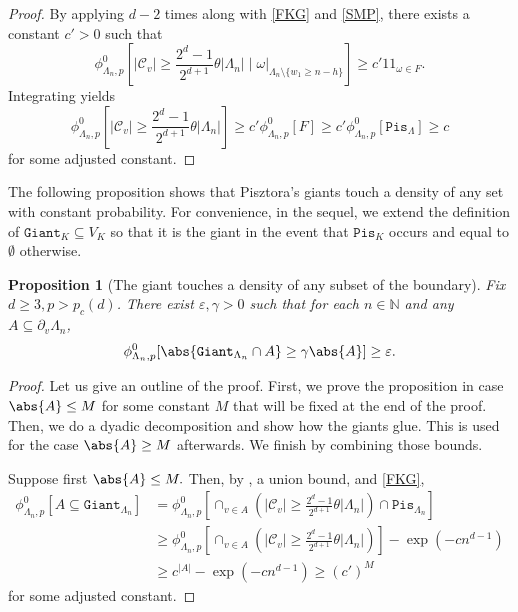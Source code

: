 \documentclass[article,11pt,reqno]{amsart}
\newcommand{\N}{\mathbb{N}}
\newcommand{\id}{1\! \!1}
\newcommand{\Giant}{\mathtt{Giant}}
\newcommand{\Pis}{\mathtt{Pis}}
\newtheorem{proposition}[theorem]{Proposition}
\begin{document}
\begin{appendix}
\begin{proof}
By applying  $d-2$ times along with \eqref{FKG} and \eqref{SMP}, there exists a constant $c'>0$ such that
$$
\phi^0_{\Lambda_n,p} \left[|\mathcal{C}_v |\geq\frac{2^d-1}{2^{d+1}}\theta|\Lambda_n| \mid \omega|_{\Lambda_n\setminus \{w_1\geq n-h\}}\right]\geq c'\id_{\omega\in F}.
$$
Integrating yields
$$
\phi^0_{\Lambda_n,p}\left[|\mathcal{C}_v|\geq \frac{2^d-1}{2^{d+1}}\theta|\Lambda_n|\right]\geq c'\phi^0_{\Lambda_n,p}[F]\geq c' \phi^0_{\Lambda_n,p}[\mathtt{Pis}_{\Lambda}]\geq c
$$
for some adjusted constant.
\end{proof}


The following proposition shows that Pisztora's giants touch a density of any set with constant probability. 
For convenience, in the sequel, we extend the definition of $\Giant_K \subseteq V_K$ so that it is the giant in the event that $\mathtt{Pis}_K$ occurs and equal to $\emptyset$ otherwise. 
\begin{proposition}[The giant touches a density of any subset of the boundary]\label{prop:giant_touches_face_density}
Fix $d \geq 3, p > p_c(d)$. There exist $\varepsilon, \gamma >0$ such that for each $n \in \N$ and any  $A \subseteq \partial_v \Lambda_n$, 
$$
\phi_{\Lambda_n,p}^0[\abs{ \mathtt{Giant}_{\Lambda_n} \cap A} \geq \gamma \abs{A}] \geq \varepsilon.
$$    
\end{proposition}
\begin{proof}
Let us give an outline of the proof. 
First, we prove the proposition in case $\abs{A}\leq M$ for some constant $M$ that will be fixed at the end of the proof. Then, we do a dyadic decomposition and show how the giants glue. This is used for the case $\abs{A}\geq M$ afterwards. We finish by combining those bounds. 

Suppose first $\abs{A}\leq M.$ Then, by , a union bound, and \eqref{FKG}, 
\begin{align*}
\phi^0_{\Lambda_n,p}[A\subseteq \mathtt{Giant}_{\Lambda_n}]&=\phi^0_{\Lambda_n,p}\left[\cap_{v\in A} \left(|\mathcal{C}_v|\geq \frac{2^d-1}{2^{d+1}}\theta|\Lambda_n|\right)\cap \mathtt{Pis}_{\Lambda_n}\right]\\
&\geq \phi^0_{\Lambda_n,p}\left[\cap_{v\in A} \left(|\mathcal{C}_v|\geq \frac{2^d-1}{2^{d+1}}\theta|\Lambda_n|\right)\right] -\exp(-cn^{d-1})\\
&\geq c^{|A|}-\exp(-cn^{d-1})\geq (c')^M
\end{align*}
for some adjusted constant.


\end{proof}
\end{appendix}
\end{document}
